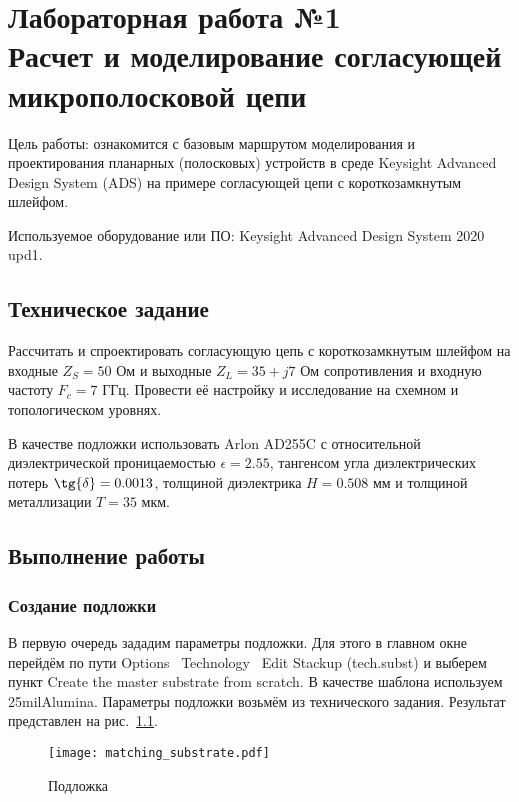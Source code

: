 \chapter{Лабораторная работа №1 \\
Расчет и моделирование согласующей микрополосковой цепи}

Цель работы: ознакомится с базовым маршрутом моделирования и проектирования планарных (полосковых) устройств в среде Keysight Advanced Design System (ADS) на примере согласующей цепи с короткозамкнутым шлейфом.

Используемое оборудование или ПО: Keysight Advanced Design System 2020 upd1.

\section{Техническое задание}

Рассчитать и спроектировать согласующую цепь с короткозамкнутым шлейфом на входные $Z_S = 50\text{~Ом}$ и выходные $Z_L = 35 + j 7 \text{~Ом}$ сопротивления и входную частоту $F_c = 7 \text{~ГГц}$.
Провести её настройку и исследование на схемном и топологическом уровнях.

В качестве подложки использовать Arlon AD255C с относительной диэлектрической проницаемостью $\epsilon = 2.55$, тангенсом угла диэлектрических потерь $\tg{\delta} = 0.0013$, толщиной диэлектрика $H = 0.508 \text{~мм}$ и толщиной металлизации $T = 35 \text{~мкм}$.

\section{Выполнение работы}

\subsection{Создание подложки}

В первую очередь зададим параметры подложки. Для этого в главном окне перейдём по пути Options \textrightarrow\ Technology \textrightarrow\ Edit Stackup (tech.subst) и выберем пункт Create the master substrate from scratch. В качестве шаблона используем 25milAlumina. Параметры подложки возьмём из технического задания. Результат представлен на рис.~\ref{fig:matching_substrate}.

\begin{figure}
    \centering
    \texttt{[image: matching\_substrate.pdf]}
    \caption{Подложка}%
    \label{fig:matching_substrate}
\end{figure}

